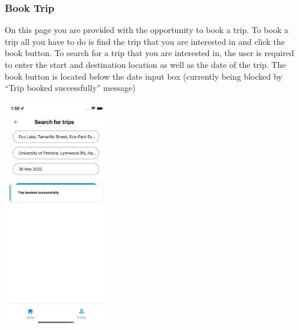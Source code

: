 \documentclass[hidelinks, 12pt, a4paper]{article}
\begin{document}
\subsubsection{Book Trip}
On this page you are provided with the opportunity to book a trip. To book a trip all you have to do is find the trip that you are interested in and click the book button. To search for a trip that you are interested in, the user is required to enter the start and destination location as well as the date of the trip.
The book button is located below the date input box (currently being blocked by “Trip booked successfully” message)
\begin{center}
  \includegraphics[height=10cm]{images/book_trip.png}
\end{center}
\end{document}
